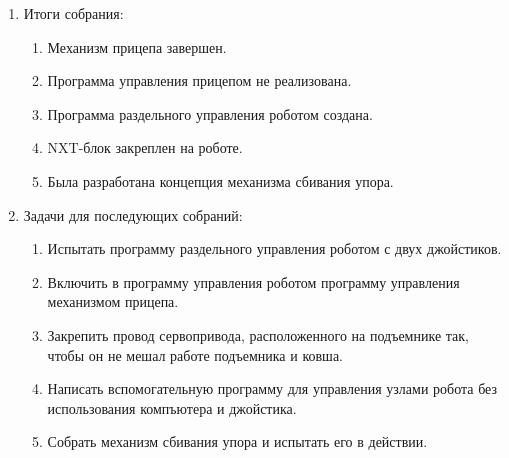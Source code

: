 \begin{enumerate}
\begin{enumerate}
	\end{enumerate}
	
	\item Итоги собрания: \newline
	\begin{enumerate}
		\item Механизм прицепа завершен.\newline
		
		\item Программа управления прицепом не реализована.\newline
		
		\item Программа раздельного управления роботом создана.\newline
		
		\item NXT-блок закреплен на роботе.\newline
		
		\item Была разработана концепция механизма сбивания упора.\newline
		
	\end{enumerate}
	
	\item Задачи для последующих собраний:\newline
	\begin{enumerate}
		\item Испытать программу раздельного управления роботом с двух джойстиков.\newline
		
		\item Включить в программу управления роботом программу управления механизмом прицепа.\newline
		
		\item Закрепить провод сервопривода, расположенного на подъемнике так, чтобы он не мешал работе подъемника и ковша.\newline
		
		\item Написать вспомогательную программу для управления узлами робота без использования компъютера и джойстика.\newline
		
		\item Собрать механизм сбивания упора и испытать его в действии.\newline
		
	\end{enumerate}     
\end{enumerate}

\fillpage

